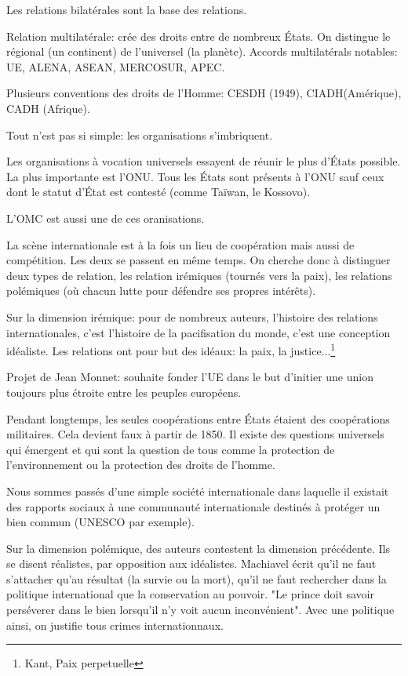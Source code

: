 ﻿\documentclass[12pt, a4paper, openany]{book}
\begin{document}
Les relations bilatérales sont la base des relations.

Relation multilatérale: crée des droits entre de nombreux États. On distingue le régional (un continent) de l'universel (la planète). Accords multilatérals notables: UE, ALENA, ASEAN, MERCOSUR, APEC.

Plusieurs conventions des droits de l'Homme: CESDH (1949), CIADH(Amérique), CADH (Afrique).

Tout n'est pas si simple: les organisations s'imbriquent.


Les organisations à vocation universels essayent de réunir le plus d'États possible. La plus importante est l'ONU. Tous les États sont présents à l'ONU sauf ceux dont le statut d'État est contesté (comme Taïwan, le Kossovo). 

L'OMC est aussi une de ces oranisations. 


La scène internationale est à la fois un lieu de coopération mais aussi de compétition. Les deux se passent en même temps. On cherche donc à distinguer deux types de relation, les relation irémiques (tournés vers la paix), les relations polémiques (où chacun lutte pour défendre ses propres intérêts).

Sur la dimension irémique: pour de nombreux auteurs, l'histoire des relations internationales, c'est l'histoire de la pacifisation du monde, c'est une conception idéaliste. Les relations ont pour but des idéaux: la paix, la justice...\footnote{Kant, Paix perpetuelle}

Projet de Jean Monnet: souhaite fonder l'UE dans le but d'initier une union toujours plus étroite entre les peuples européens. 

Pendant longtemps, les seules coopérations entre États étaient des coopérations militaires. Cela devient faux à partir de 1850. Il existe des questions universels qui émergent et qui sont la question de tous comme la protection de l'environnement ou la protection des droits de l'homme.

Nous sommes passés d'une simple société internationale dans laquelle il existait des rapports sociaux à une communauté internationale destinés à protéger un bien commun (UNESCO par exemple).


Sur la dimension polémique, des auteurs contestent la dimension précédente. Ils se disent réalistes, par opposition aux idéalistes. Machiavel écrit qu'il ne faut s'attacher qu'au résultat (la survie ou la mort), qu'il ne faut rechercher dans la politique international que la conservation au pouvoir. "Le prince doit savoir perséverer dans le bien lorsqu'il n'y voit aucun inconvénient". Avec une politique ainsi, on justifie tous crimes internationnaux.
\end{document}
